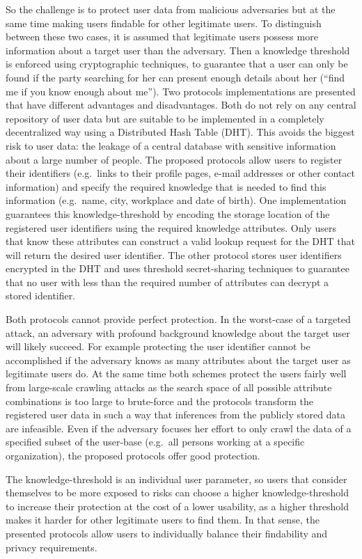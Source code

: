So the challenge is to protect user data from malicious adversaries but
at the same time making users findable for other legitimate users. To
distinguish between these two cases, it is assumed that legitimate users
possess more information about a target user than the adversary. Then a
knowledge threshold is enforced using cryptographic techniques, to
guarantee that a user can only be found if the party searching for her
can present enough details about her (\enquote{find me if you know enough about
me}). Two protocols implementations are presented that have different
advantages and disadvantages. Both do not rely on any central repository
of user data but are suitable to be implemented in a completely
decentralized way using a Distributed Hash Table (DHT). This avoids the
biggest risk to user data: the leakage of a central database with
sensitive information about a large number of people.
The proposed protocols allow users to register their identifiers (e.g.\ 
links to their profile pages, e-mail addresses or other contact
information) and specify the required knowledge that is needed to find
this information (e.g.\  name, city, workplace and date of birth). One
implementation guarantees this knowledge-threshold by encoding the
storage location of the registered user identifiers using the required
knowledge attributes. Only users that know these attributes can
construct a valid lookup request for the DHT that will return the
desired user identifier. The other protocol stores user identifiers
encrypted in the DHT and uses threshold secret-sharing techniques to
guarantee that no user with less than the required number of attributes
can decrypt a stored identifier.

Both protocols cannot provide perfect protection. In the worst-case of a
targeted attack, an adversary with profound background knowledge about
the target user will likely succeed. For example protecting the user
identifier cannot be accomplished if the adversary knows as many
attributes about the target user as legitimate users do.
At the same time both schemes protect the users fairly well from
large-scale crawling attacks as the search space of all possible
attribute combinations is too large to brute-force and the protocols
transform the registered user data in such a way that inferences from
the publicly stored data are infeasible. Even if the adversary focuses
her effort to only crawl the data of a specified subset of the user-base
(e.g.\  all persons working at a specific organization), the proposed
protocols offer good protection. 

The knowledge-threshold is an individual user parameter, so users that
consider themselves to be more exposed to risks can choose a higher
knowledge-threshold to increase their protection at the cost of a lower
usability, as a higher threshold makes it harder for other legitimate
users to find them. In that sense, the presented protocols allow users
to individually balance their findability and privacy requirements.

